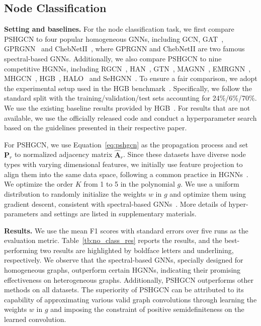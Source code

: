 \documentclass{article}
\begin{document}
\subsection{Node Classification}\label{se:node}
\textbf{Setting and baselines.} For the node classification task, we first compare PSHGCN to 
four popular homogeneous GNNs, including GCN\cite{gcn}, GAT~\cite{gat}, GPRGNN~\cite{gprgnn} and ChebNetII~\cite{chebnetii}, where GPRGNN and ChebNetII are two famous spectral-based GNNs. Additionally, we also compare PSHGCN to nine competitive HGNNs, including RGCN~\cite{rgcn}, HAN~\cite{han}, GTN~\cite{gtn}, MAGNN~\cite{magnn}, EMRGNN~\cite{emrgnn}, MHGCN~\cite{mhgcn}, HGB~\cite{hgb}, HALO~\cite{halo} and SeHGNN~\cite{sehgnn}. To ensure a fair comparison, we adopt the experimental setup used in the HGB benchmark~\cite{hgb}. Specifically, we follow the standard split with the training/validation/test sets accounting for 24\%/6\%/70\%. We use the existing baseline results provided by HGB~\cite{hgb}. For results that are not available, we use the officially released code and conduct a hyperparameter search based on the guidelines presented in their respective paper.


For PSHGCN, we use Equation~\eqref{eq:pshgcn} as the propagation process and set $\mathbf{P}_r$ to normalized adjacency matrix $\hat{\mathbf{A}}_r$. Since these datasets have diverse node types with varying dimensional features, we initially use feature projection to align them into the same data space, following a common practice in HGNNs~\cite{sehgnn,hgb,emrgnn}. We optimize the order $K$ from 1 to 5 in the polynomial $g$. We use a uniform distribution to randomly initialize the weights $w$ in $g$ and optimize them using gradient descent, consistent with spectral-based GNNs~\cite{gprgnn,bernnet,chebnetii}. More details of hyper-parameters and settings are listed in supplementary materials. 



\textbf{Results.} We use the mean F1 scores with standard errors over five runs as the evaluation metric. Table~\ref{tb:no_class_res} reports the results, and the best-performing two results are highlighted by boldface letters and underlining, respectively. We observe that the spectral-based GNNs, specially designed for homogeneous graphs, outperform certain HGNNs, indicating their promising effectiveness on heterogeneous graphs. Additionally, PSHGCN outperforms other methods on all datasets. The superiority of PSHGCN can be attributed to its capability of approximating various valid graph convolutions through learning the weights $w$ in $g$ and imposing the constraint of positive semidefiniteness on the learned convolution.
\end{document}
